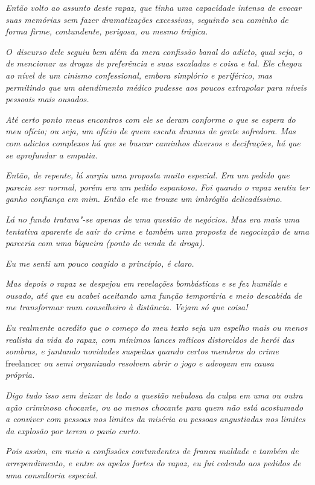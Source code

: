 \emph{Então volto ao assunto deste rapaz, que tinha uma capacidade
intensa de evocar suas memórias sem fazer dramatizações excessivas,
seguindo seu caminho de forma firme, contundente, perigosa, ou mesmo
trágica.}~

\emph{O~discurso dele seguiu bem além da mera confissão banal do adicto,
qual seja, o de mencionar as drogas de preferência e suas escaladas e
coisa e tal. Ele chegou ao nível de um cinismo confessional, embora
simplório e periférico, mas permitindo que um atendimento médico pudesse
aos poucos extrapolar para níveis pessoais mais ousados.}~

\emph{Até certo ponto meus encontros com ele se deram conforme o que se
espera do meu ofício; ou seja, um ofício de quem escuta dramas de gente
sofredora. Mas com adictos complexos há que se buscar caminhos diversos
e decifrações, há que se aprofundar a empatia.}~

\emph{Então, de repente, lá surgiu uma proposta muito especial. Era um
pedido que parecia ser normal, porém era um pedido espantoso. Foi quando
o rapaz sentiu ter ganho confiança em mim. Então ele me trouxe um
imbróglio delicadíssimo.}~

\emph{Lá no fundo tratava"-se apenas de uma questão de negócios. Mas era
mais uma tentativa aparente de sair do crime e também uma proposta de
negociação de uma parceria com uma biqueira (ponto de venda de droga).}~

\emph{Eu me senti um pouco coagido a princípio, é claro.}~

\emph{Mas depois o rapaz se despejou em revelações bombásticas e se fez
humilde e ousado, até que eu acabei aceitando uma função temporária e
meio descabida de me transformar num conselheiro à distância. Vejam só
que coisa!}

\emph{Eu realmente acredito que o começo do meu texto seja um espelho
mais ou menos realista da vida do rapaz, com mínimos lances míticos
distorcidos de herói das sombras, e juntando novidades suspeitas quando
certos membros do crime} freelancer \emph{ou semi organizado resolvem abrir o
jogo e advogam em causa própria.}~

\emph{Digo tudo isso sem deixar de lado a questão nebulosa da culpa em
uma ou outra ação criminosa chocante, ou ao menos chocante para quem não
está acostumado a conviver com pessoas nos limites da miséria ou pessoas
angustiadas nos limites da explosão por terem o pavio curto.}~

\emph{Pois assim, em meio a confissões contundentes de franca maldade e
também de arrependimento, e entre os apelos fortes do rapaz, eu fui
cedendo aos pedidos de uma consultoria especial.}~

